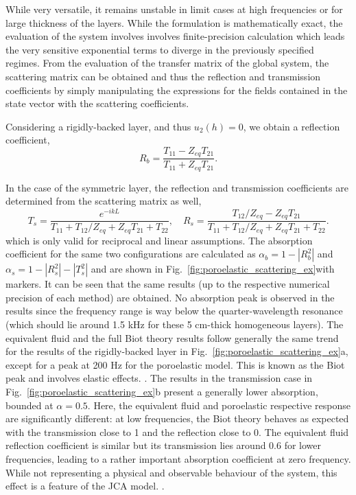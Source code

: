 While very versatile, it remains unstable in limit cases at high frequencies or for large thickness of the layers. While the formulation is mathematically exact, the evaluation of the system involves involves finite-precision calculation which leads the very sensitive exponential terms to diverge in the previously specified regimes. From the evaluation of the transfer matrix of the global system, the scattering matrix can be obtained and thus the reflection and transmission coefficients by simply manipulating the expressions for the fields contained in the state vector with the scattering coefficients. 

Considering a rigidly-backed layer, and thus $u_2(h) = 0$, we obtain a reflection coefficient,
\begin{equation}
    R_b =\frac{T_{11}-Z_{eq}T_{21}}{T_{11}+Z_{eq}T_{21}}.
\end{equation}

In the case of the symmetric layer, the reflection and transmission coefficients are determined from the scattering matrix as well, 
\begin{equation}
    T_s = \frac{e^{-ikL}}{T_{11}+T_{12}/Z_{eq}+Z_{eq}T_{21}+T_{22}}, \quad
    R_s = \frac{T_{12}/Z_{eq}-Z_{eq}T_{21}}{T_{11}+T_{12}/Z_{eq}+Z_{eq}T_{21}+T_{22}}.
\end{equation}
which is only valid for reciprocal and linear assumptions. The absorption coefficient for the same two configurations are calculated as $\alpha_b = 1 - |R_b^2|$ and $\alpha_s = 1 - |R_s^2| - |T_s^2|$ and are shown in Fig.~\ref{fig:poroelastic_scattering_ex}with markers. It can be seen that the same results (up to the respective numerical precision of each method) are obtained. No absorption peak is observed in the results since the frequency range is way below the quarter-wavelength resonance (which should lie around 1.5 kHz for these 5 cm-thick homogeneous layers). The equivalent fluid and the full Biot theory results follow generally the same trend for the results of the rigidly-backed layer in Fig.~\ref{fig:poroelastic_scattering_ex}a, except for a peak at 200 Hz for the poroelastic model. This is known as the Biot peak and involves elastic effects. \cite{zielinski2011, weisser2016}. The results in the transmission case in Fig.~\ref{fig:poroelastic_scattering_ex}b present a generally lower absorption, bounded at $\alpha = 0.5$. Here, the equivalent fluid and poroelastic respective response are significantly different: at low frequencies, the Biot theory behaves as expected with the transmission close to 1 and the reflection close to 0. The equivalent fluid reflection coefficient is similar but its transmission lies around 0.6 for lower frequencies, leading to a rather important absorption coefficient at zero frequency. While not representing a physical and observable behaviour of the system, this effect is a feature of the JCA model. . 

